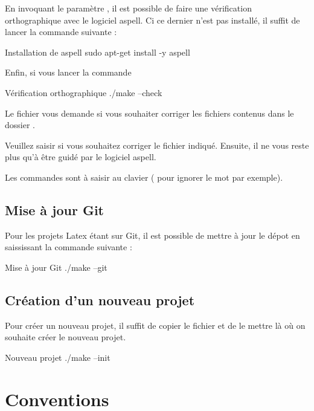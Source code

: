 En invoquant le paramètre , il est possible de faire une vérification orthographique avec le logiciel aspell. Ci ce dernier n'est pas installé, il suffit de lancer la commande suivante : 

\begin{Bash}{Installation de aspell}
sudo apt-get install -y aspell
\end{Bash}

Enfin, si vous lancer la commande 

\begin{Bash}{Vérification orthographique}
./make --check
\end{Bash}

Le fichier  vous demande si vous souhaiter corriger les fichiers contenus dans le dossier .


Veuillez saisir  si vous souhaitez corriger le fichier indiqué.
Ensuite, il ne vous reste plus qu'à être guidé par le logiciel aspell.


Les commandes sont à saisir au clavier ( pour ignorer le mot par exemple).

\subsection{Mise à jour Git}

Pour les projets Latex étant sur Git, il est possible de mettre à jour le dépot en saississant la commande suivante : 
\begin{Bash}{Mise à jour Git}
./make --git
\end{Bash}

\subsection{Création d'un nouveau projet}

Pour créer un nouveau projet, il suffit de copier le fichier  et de le mettre là où on souhaite créer le nouveau projet.
\begin{Bash}{Nouveau projet}
./make --init
\end{Bash}

\section{Conventions}

